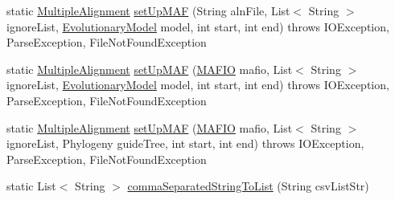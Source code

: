 \begin{DoxyCompactItemize}
\item 
static \hyperlink{classbroad_1_1core_1_1multiplealignment_1_1_multiple_alignment}{Multiple\+Alignment} \hyperlink{classbroad_1_1core_1_1siphy_1_1_conservation_utils_ae322901c948bd97e564e120f7f98046c}{set\+Up\+M\+A\+F} (String aln\+File, List$<$ String $>$ ignore\+List, \hyperlink{classbroad_1_1core_1_1siphy_1_1_evolutionary_model}{Evolutionary\+Model} model, int start, int end)  throws I\+O\+Exception, Parse\+Exception, 			\+File\+Not\+Found\+Exception 
\item 
static \hyperlink{classbroad_1_1core_1_1multiplealignment_1_1_multiple_alignment}{Multiple\+Alignment} \hyperlink{classbroad_1_1core_1_1siphy_1_1_conservation_utils_a2e8a2956dfe5e74d9cf4fbf09bb29fed}{set\+Up\+M\+A\+F} (\hyperlink{classbroad_1_1core_1_1multiplealignment_1_1_m_a_f_i_o}{M\+A\+F\+I\+O} mafio, List$<$ String $>$ ignore\+List, \hyperlink{classbroad_1_1core_1_1siphy_1_1_evolutionary_model}{Evolutionary\+Model} model, int start, int end)  throws I\+O\+Exception, Parse\+Exception, 			\+File\+Not\+Found\+Exception 
\item 
static \hyperlink{classbroad_1_1core_1_1multiplealignment_1_1_multiple_alignment}{Multiple\+Alignment} \hyperlink{classbroad_1_1core_1_1siphy_1_1_conservation_utils_a76de2884d27bb9c00b5ddb2ab0fe8b70}{set\+Up\+M\+A\+F} (\hyperlink{classbroad_1_1core_1_1multiplealignment_1_1_m_a_f_i_o}{M\+A\+F\+I\+O} mafio, List$<$ String $>$ ignore\+List, Phylogeny guide\+Tree, int start, int end)  throws I\+O\+Exception, Parse\+Exception, 			\+File\+Not\+Found\+Exception 
\item 
static List$<$ String $>$ \hyperlink{classbroad_1_1core_1_1siphy_1_1_conservation_utils_a5fe0b616c5840dc5e6cd74bed82a1ee3}{comma\+Separated\+String\+To\+List} (String csv\+List\+Str)
\end{DoxyCompactItemize}


